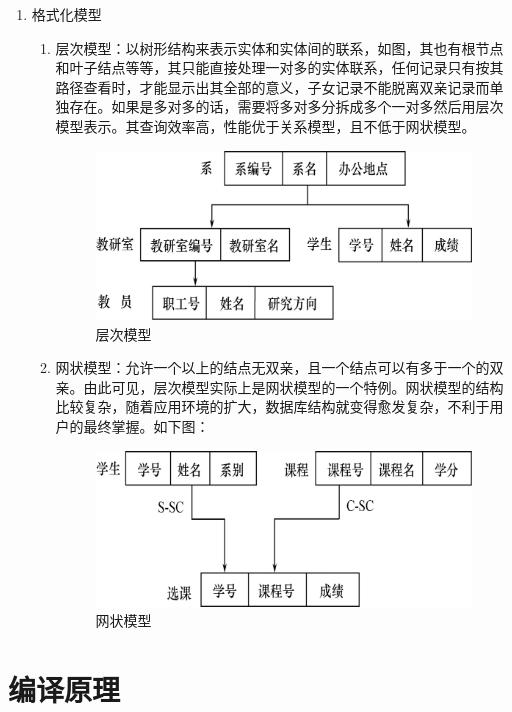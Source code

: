 \begin{enumerate}
    \item 格式化模型
        \begin{enumerate}
            \item 层次模型：以树形结构来表示实体和实体间的联系，如图，其也有根节点和叶子结点等等，其只能直接处理一对多的实体联系，任何记录只有按其路径查看时，才能显示出其全部的意义，子女记录不能脱离双亲记录而单独存在。如果是多对多的话，需要将多对多分拆成多个一对多然后用层次模型表示。其查询效率高，性能优于关系模型，且不低于网状模型。
                \begin{figure}[H]
                    \centering
                    \includegraphics[scale=0.5]{./images/0020.png}
                    \caption{层次模型}
                \end{figure}
            \item 网状模型：允许一个以上的结点无双亲，且一个结点可以有多于一个的双亲。由此可见，层次模型实际上是网状模型的一个特例。网状模型的结构比较复杂，随着应用环境的扩大，数据库结构就变得愈发复杂，不利于用户的最终掌握。如下图：
                \begin{figure}[H]
                    \centering
                    \includegraphics[scale=0.5]{./images/0021.png}
                    \caption{网状模型}
                \end{figure}



        \end{enumerate}
\end{enumerate}

\section{编译原理}
